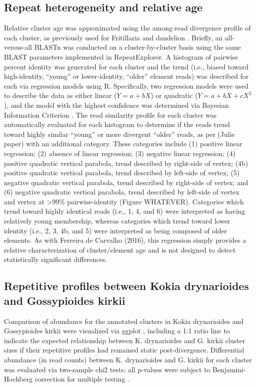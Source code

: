 \documentclass[10pt,letterpaper]{article}
\begin{document}
\subsection*{Repeat heterogeneity and relative age}
Relative cluster age was approximated using the among-read divergence profile of
each cluster, as previously used for Fritillaria \cite{Kelly2015} and dandelion
\cite{Ferreira2016}. Briefly, an all-versus-all BLASTn \cite{Boratyn2013}
\cite{Altshul1990} was conducted on a cluster-by-cluster basis using the same
BLAST parameters implemented in RepeatExplorer. A histogram of pairwise percent
identity was generated for each cluster and the trend (i.e., biased toward
high-identity, “young” or lower-identity, “older” element reads) was described
for each via regression models using R. Specifically, two regression models were
used to describe the data as either linear ($Y = a + bX$) or quadratic
($Y = a + bX + cX^2$), and the model with the highest confidence was determined
via Bayesian Information Criterion \cite{Schwarz1978}. The read similarity
profile for each cluster was automatically evaluated for each histogram to
determine if the reads trend toward highly similar “young” or more divergent
“older” reads, as per (Julie paper) with an additional category. These
categories include (1) positive linear regression; (2) absence of linear
regression; (3) negative linear regression; (4) positive quadratic vertical
parabola, trend described by right-side of vertex; (4b) positive quadratic
vertical parabola, trend described by left-side of vertex; (5) negative
quadratic vertical parabola, trend described by right-side of vertex; and (6)
negative quadratic vertical parabola, trend described by left-side of vertex and
vertex at >99\% pairwise-identity (Figure WHATEVER). Categories which trend
toward highly identical reads (i.e., 1, 4, and 6) were interpreted as having
relatively young membership, whereas categories which trend toward lower
identity (i.e., 2, 3, 4b, and 5) were interpreted as being composed of older
elements. As with Ferreira de Carvalho (2016), this regression simply provides a
relative characterization of cluster/element age and is not designed to detect
statistically significant differences.

\subsection*{Repetitive profiles between Kokia drynarioides and Gossypioides kirkii}
Comparison of abundance  for the annotated clusters in Kokia drynarioides and
Gossypioides kirkii were visualized via ggplot \cite{Wickham2016}, including a
1:1 ratio line to indicate the expected relationship between K. drynarioides and
G. kirkii cluster sizes if their repetitive profiles had remained static
post-divergence. Differential abundance (in read counts) between K. drynarioides
and G. kirkii for each cluster was evaluated via two-sample chi2 tests; all
p-values were subject to Benjamini-Hochberg correction for multiple testing
\cite{Benjamini2001}.
\end{document}
